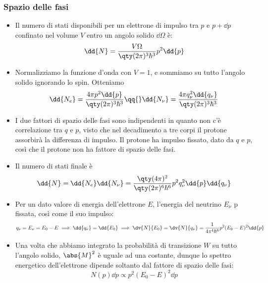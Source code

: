 \subsubsection{Spazio delle fasi}
\begin{itemize}
    \item Il numero di stati disponibili per un elettrone di impulso tra $p$ e $p+\dd{p}$ confinato nel volume $V$ entro un angolo solido $\dd{\Omega}$ è:
    \begin{equation*}
    \dd{N}=\frac{V\Omega}{\qty(2\pi)^3\hbar^3}p^2\dd{p}
    \end{equation*}
    \item Normalizziamo la funzione d'onda con $V=1$, e sommiamo su tutto l'angolo solido ignorando lo spin. Otteniamo
    \begin{equation*}
    \dd{N_e}=\frac{4\pi p^2\dd{p}}{\qty(2\pi)^3\hbar^3}\qq{}\dd{N_\nu}=\frac{4\pi q_\nu^2\dd{q_\nu}}{\qty(2\pi)^3\hbar^3} 
    \end{equation*}
    \item I due fattori di spazio delle fasi sono indipendenti in quanto non c'è correlazione tra $q$ e $p$, visto che nel decadimento a tre corpi il protone assorbirà la differenza di impulso. Il protone ha impulso fissato, dato da $q$ e $p$, così che il protone non ha fattore di spazio delle fasi.
    \item Il numero di stati finale è 
    \begin{equation*}
    \dd{N}=\dd{N_e}\dd{N_\nu}=\frac{\qty(4\pi)^2}{\qty(2\pi)^6\hbar^6}p^2q_\nu^2\dd{p}\dd{q_\nu}
    \end{equation*}
    \item Per un dato valore di energia dell'elettrone $E$, l'energia del neutrino $E_\nu$ p fissata, così come il suo impulso:
    \begin{equation*}
    q_\nu=E_\nu=E_0-E\implies\dd{q_\nu}=\dd{E_0}\implies\dv{N}{E_0}=\dv{N}{q_\nu}=\frac{1}{4\pi^4\hbar^6}p^2(E_0-E)^2\dd{p}
    \end{equation*}
    \item Una volta che abbiamo integrato la probabilità di transizione $W$ su tutto l'angolo solido, $\abs{M}^2$ è uguale ad una costante, dunque lo spettro energetico dell'elettrone dipende soltanto dal fattore di spazio delle fasi:
    \begin{equation*}
    N(p)\dd{p}\propto p^2(E_0-E)^2\dd{p}
    \end{equation*}
\end{itemize}
